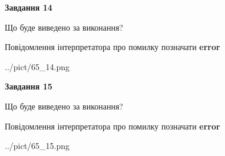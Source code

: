 \documentclass[11pt, ukrainian]{article}
\begin{document}
{\begin {large}
{\begin {center}\textbf{Завдання 14}\end {center}}\par
Що буде виведено за виконання? \par
Повідомлення інтерпретатора про помилку позначати \textbf{error}

\begin{center}
	{../pict/65_14.png}
\end{center}
\newpage

{\begin {center}\textbf{Завдання 15}\end {center}}\par
Що буде виведено за виконання? \par
Повідомлення інтерпретатора про помилку позначати \textbf{error}

\begin{center}
	{../pict/65_15.png}
\end{center}
\newpage

\end {large}}
\end{document}
